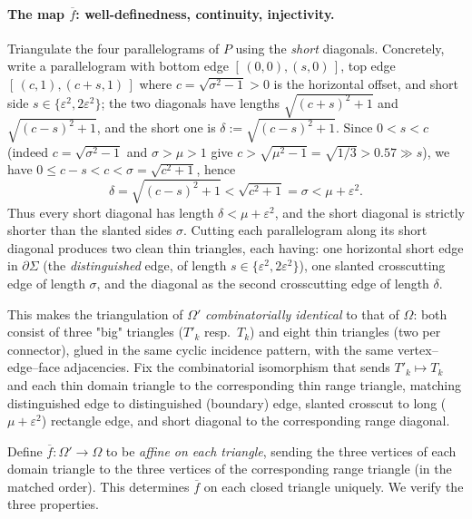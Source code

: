\documentclass[12pt]{article}
\newcommand{\eps}{\varepsilon}
\newcommand{\Sig}{\Sigma}
\begin{document}
\paragraph{The map $\overline f$: well-definedness, continuity, injectivity.}
Triangulate the four parallelograms of $P$ using the \emph{short}
diagonals. Concretely, write a parallelogram with bottom edge
$[\,(0,0),(s,0)\,]$, top edge $[\,(c,1),(c+s,1)\,]$ where
$c=\sqrt{\sigma^2-1}>0$ is the horizontal offset, and short side
$s\in\{\eps^2,2\eps^2\}$; the two diagonals have lengths
$\sqrt{(c+s)^2+1}$ and $\sqrt{(c-s)^2+1}$, and the short one is
$\delta:=\sqrt{(c-s)^2+1}$. Since $0<s<c$ (indeed $c=\sqrt{\sigma^2-1}$ and
$\sigma>\mu>1$ give $c>\sqrt{\mu^2-1}=\sqrt{1/3}>0.57\gg s$), we have
$0\le c-s<c<\sigma=\sqrt{c^2+1}$, hence
\begin{equation}\label{eq:diag}
\delta=\sqrt{(c-s)^2+1}<\sqrt{c^2+1}=\sigma<\mu+\eps^2 .
\end{equation}
Thus every short diagonal has length $\delta<\mu+\eps^2$, and the short
diagonal is strictly shorter than the slanted sides $\sigma$. Cutting each
parallelogram along its short diagonal produces two clean thin triangles,
each having: one horizontal short edge in $\partial\Sig$ (the
\emph{distinguished} edge, of length $s\in\{\eps^2,2\eps^2\}$), one slanted
crosscutting edge of length $\sigma$, and the diagonal as the second
crosscutting edge of length $\delta$.

This makes the triangulation of $\Omega'$ \emph{combinatorially identical}
to that of $\Omega$: both consist of three "big" triangles ($T'_k$ resp.\
$T_k$) and eight thin triangles (two per connector), glued in the same
cyclic incidence pattern, with the same vertex--edge--face adjacencies.
Fix the combinatorial isomorphism that sends $T'_k\mapsto T_k$ and each
thin domain triangle to the corresponding thin range triangle, matching
distinguished edge to distinguished (boundary) edge, slanted crosscut to
long ($\mu+\eps^2$) rectangle edge, and short diagonal to the
corresponding range diagonal.

Define $\overline f:\Omega'\to\Omega$ to be \emph{affine on each triangle},
sending the three vertices of each domain triangle to the three vertices of
the corresponding range triangle (in the matched order). This determines
$\overline f$ on each closed triangle uniquely. We verify the three
properties.
\end{document}
